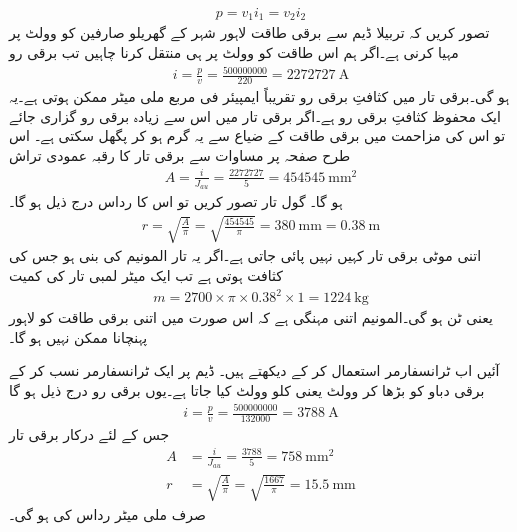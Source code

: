 %
\begin{align*}
p=v_1 i_1 = v_2 i_2
\end{align*}
تصور کریں کہ تربیلا ڈیم  سے   برقی طاقت  لاہور شہر کے گھریلو صارفین کو   وولٹ پر مہیا کرنی ہے۔اگر ہم اس طاقت کو   وولٹ پر ہی منتقل کرنا چاہیں تب برقی رو
\begin{align*}
i=\frac{p}{v}=\frac{\num{500000000}}{220}=\SI{2272727}{\ampere}
\end{align*}
ہو گی۔برقی تار میں کثافتِ برقی رو  تقریباً  ایمپیئر فی مربع ملی میٹر   ممکن ہوتی ہے۔یہ ایک محفوظ کثافتِ برقی رو ہے۔اگر برقی تار میں اس سے زیادہ برقی رو گزاری جائے تو اس کی مزاحمت میں برقی طاقت کے ضیاع سے یہ گرم ہو کر پگھل سکتی ہے۔ اس طرح صفحہ  پر  مساوات  سے برقی تار کا رقبہ عمودی تراش
\begin{align*}
A=\frac{i}{J_{au}}=\frac{\num{2272727}}{5}=\SI{454545}{\milli\meter\squared}
\end{align*}
ہو گا۔ گول تار تصور کریں تو اس کا رداس درج ذیل ہو گا۔
\begin{align*}
r=\sqrt{\frac{A}{\pi}}=\sqrt{\frac{\num{454545}}{\pi}}=\SI{380}{\milli\meter}=\SI{0.38}{\meter}
\end{align*}
اتنی موٹی برقی تار کہیں نہیں پائی جاتی ہے۔اگر یہ تار المونیم کی بنی ہو جس کی  کثافت   ہوتی ہے تب ایک میٹر لمبی تار کی کمیت
\begin{align*}
m=2700 \times \pi \times 0.38^2 \times 1=\SI{1224}{\kilo\gram}
\end{align*}
یعنی  ٹن ہو گی۔المونیم اتنی مہنگی ہے کہ اس صورت میں اتنی برقی طاقت کو لاہور پہنچانا ممکن نہیں ہو گا۔

آئیں اب ٹرانسفارمر استعمال کر کے دیکھتے ہیں۔ ڈیم پر ایک ٹرانسفارمر نسب کر کے برقی دباو کو بڑھا کر   وولٹ یعنی  کلو وولٹ  کیا جاتا ہے۔یوں برقی رو درج ذیل ہو گا
\begin{align*}
i=\frac{p}{v}=\frac{\num{500000000}}{\num{132000}}=\SI{3788}{\ampere}
\end{align*}
جس کے لئے درکار برقی تار
\begin{align*}
A&=\frac{i}{J_{au}}=\frac{\num{3788}}{5}=\SI{758}{\milli\meter\squared}\\
r&=\sqrt{\frac{A}{\pi}}=\sqrt{\frac{1667}{\pi}}=\SI{15.5}{\milli\meter}
\end{align*}
صرف  ملی میٹر رداس کی ہو گی۔ 
%

